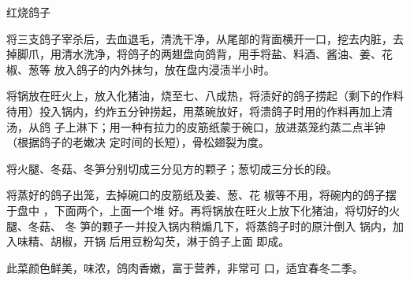 \begin{recipe}{红烧鸽子}

\ingredients


\cooking

\step 将三支鸽子宰杀后，去血退毛，清洗干净，从尾部的背面横开一口，挖去内脏，去
掉脚爪，用清水洗净，将鸽子的两翅盘向鸽背，用手将盐、料酒、酱油、姜、花椒、葱等
放入鸽子的内外抹匀，放在盘内浸渍半小时。

\step 将锅放在旺火上，放入化猪油，烧至七、八成热，将渍好的鸽子捞起（剩下的作料
待用）投入锅内，约炸五分钟捞起，用蒸碗放好，将溃鸽子时用的作料再加上清汤，从鸽
子上淋下；用一种有拉力的皮筋纸蒙于碗口，放进蒸笼约蒸二点半钟（根据鸽子的老嫩决
定时间的长短），骨松翅裂为度。

\step 将火腿、冬菇、冬笋分别切成三分见方的颗子；葱切成三分长的段。

将蒸好的鸽子出笼，去掉碗口的皮筋纸及姜、葱、花 椒等不用，将碗内的鸽子摆于盘中
，下面两个，上面一个堆 好。再将锅放在旺火上放下化猪油，将切好的火腿、冬菇、 冬
笋的颗子一并投入锅内稍煽几下，将蒸鸽子时的原汁倒入 锅内，加入味精、胡椒，开锅
后用豆粉勾芡，淋于鸽子上面 即成。

\features

此菜颜色鲜美，味浓，鸽肉香嫩，富于营养，非常可 口，适宜春冬二季。

\end{recipe}

